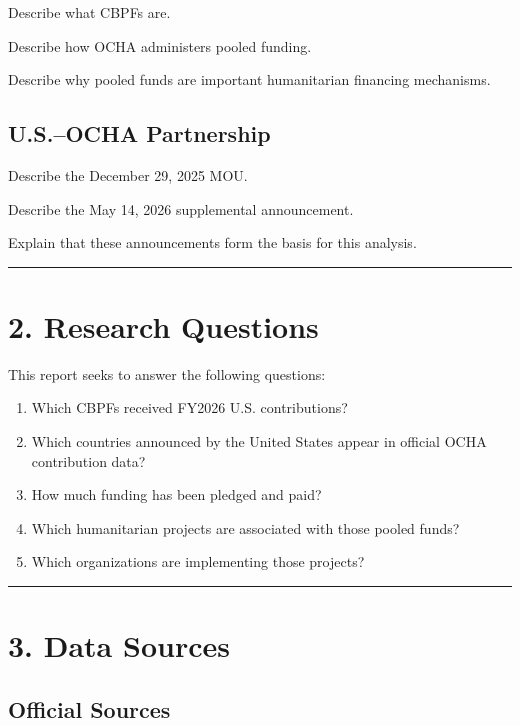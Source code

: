 \documentclass[
  11pt,
  letterpaper,
  DIV=11,
  numbers=noendperiod]{scrartcl}
\providecommand{\tightlist}{%
  \setlength{\itemsep}{0pt}\setlength{\parskip}{0pt}}
\begin{document}
Describe what CBPFs are.

Describe how OCHA administers pooled funding.

Describe why pooled funds are important humanitarian financing
mechanisms.

\subsection{U.S.--OCHA Partnership}\label{u.s.ocha-partnership}

Describe the December 29, 2025 MOU.

Describe the May 14, 2026 supplemental announcement.

Explain that these announcements form the basis for this analysis.

\begin{center}\rule{0.5\linewidth}{0.5pt}\end{center}

\section{2. Research Questions}\label{research-questions}

This report seeks to answer the following questions:

\begin{enumerate}
\def\labelenumi{\arabic{enumi}.}
\tightlist
\item
  Which CBPFs received FY2026 U.S. contributions?
\item
  Which countries announced by the United States appear in official OCHA
  contribution data?
\item
  How much funding has been pledged and paid?
\item
  Which humanitarian projects are associated with those pooled funds?
\item
  Which organizations are implementing those projects?
\end{enumerate}

\begin{center}\rule{0.5\linewidth}{0.5pt}\end{center}

\section{3. Data Sources}\label{data-sources}

\subsection{Official Sources}\label{official-sources}
\end{document}
